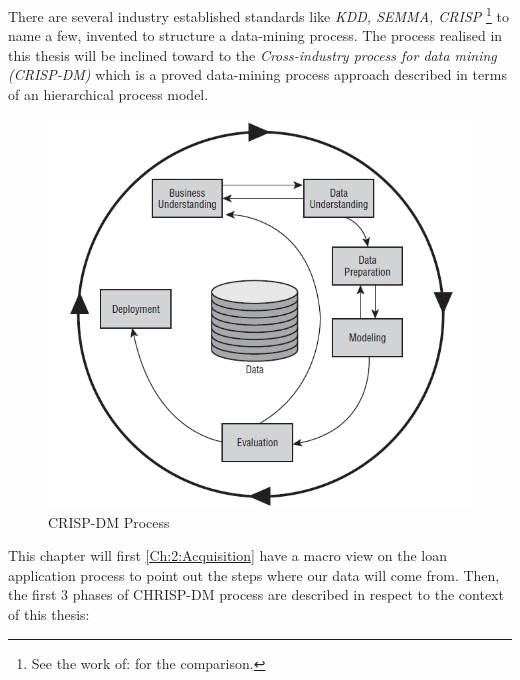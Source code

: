 There are several industry established standards like \textit{KDD, SEMMA, CRISP} \footnote{See the work of: \cite{Abraham;Ajith:2008}  for the comparison.} to name a few, invented to structure a data-mining process. The process realised in this thesis will be inclined toward to the \textit{Cross-industry process for data mining (CRISP-DM)} \cite{crisp} which is a proved data-mining process approach described in terms of an hierarchical process model.
\begin{figure}[h]
    \centering
    \includegraphics[scale=0.4]{Graphics/crisp-dm.png}
    \caption{CRISP-DM Process}
    \label{fig:crisp-dm}
\end{figure}
\newline
\newline
\newline
This chapter will first \ref{Ch:2:Acquisition} have a macro view on the loan application process to point out the steps where our data will come from. %
Then, the first 3 phases of CHRISP-DM process are described in respect to the context of this thesis:
